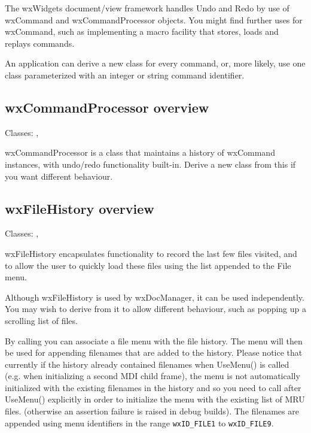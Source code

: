 The wxWidgets document/view framework handles Undo and Redo by use of
wxCommand and wxCommandProcessor objects. You might find further uses
for wxCommand, such as implementing a macro facility that stores, loads
and replays commands.

An application can derive a new class for every command, or, more likely, use
one class parameterized with an integer or string command identifier.

\subsection{wxCommandProcessor overview}\label{wxcommandprocessoroverview}


Classes: , 

wxCommandProcessor is a class that maintains a history of wxCommand
instances, with undo/redo functionality built-in. Derive a new class from this
if you want different behaviour.

\subsection{wxFileHistory overview}\label{wxfilehistoryoverview}


Classes: , 

wxFileHistory encapsulates functionality to record the last few files visited, and
to allow the user to quickly load these files using the list appended to the File menu.

Although wxFileHistory is used by wxDocManager, it can be used independently. You may wish
to derive from it to allow different behaviour, such as popping up a scrolling
list of files.

By calling  you can
associate a file menu with the file history. The menu will then be used for
appending filenames that are added to the history. Please notice that currently
if the history already contained filenames when UseMenu() is called (e.g. when
initializing a second MDI child frame), the menu is not automatically
initialized with the existing filenames in the history and so you need to call
 after UseMenu()
explicitly in order to initialize the menu with the existing list of MRU files.
(otherwise an assertion failure is raised in debug builds).
The filenames are appended using menu identifiers in the range
\texttt{wxID\_FILE1} to \texttt{wxID\_FILE9}.

